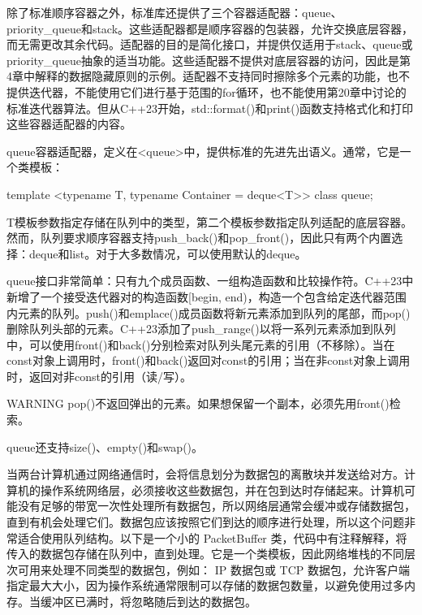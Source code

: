 
除了标准顺序容器之外，标准库还提供了三个容器适配器：queue、priority\_queue和stack。这些适配器都是顺序容器的包装器，允许交换底层容器，而无需更改其余代码。适配器的目的是简化接口，并提供仅适用于stack、queue或priority\_queue抽象的适当功能。这些适配器不提供对底层容器的访问，因此是第4章中解释的数据隐藏原则的示例。适配器不支持同时擦除多个元素的功能，也不提供迭代器，不能使用它们进行基于范围的for循环，也不能使用第20章中讨论的标准迭代器算法。但从C++23开始，std::format()和print()函数支持格式化和打印这些容器适配器的内容。


queue容器适配器，定义在<queue>中，提供标准的先进先出语义。通常，它是一个类模板：

\begin{cpp}
template <typename T, typename Container = deque<T>> class queue;
\end{cpp}

T模板参数指定存储在队列中的类型，第二个模板参数指定队列适配的底层容器。然而，队列要求顺序容器支持push\_back()和pop\_front()，因此只有两个内置选择：deque和list。对于大多数情况，可以使用默认的deque。


queue接口非常简单：只有九个成员函数、一组构造函数和比较操作符。C++23中新增了一个接受迭代器对的构造函数[begin, end)，构造一个包含给定迭代器范围内元素的队列。push()和emplace()成员函数将新元素添加到队列的尾部，而pop()删除队列头部的元素。C++23添加了push\_range()以将一系列元素添加到队列中，可以使用front()和back()分别检索对队列头尾元素的引用（不移除）。当在const对象上调用时，front()和back()返回对const的引用；当在非const对象上调用时，返回对非const的引用（读/写）。

\begin{myWarning}{WARNING}
pop()不返回弹出的元素。如果想保留一个副本，必须先用front()检索。
\end{myWarning}

queue还支持size()、empty()和swap()。


当两台计算机通过网络通信时，会将信息划分为数据包的离散块并发送给对方。计算机的操作系统网络层，必须接收这些数据包，并在包到达时存储起来。计算机可能没有足够的带宽一次性处理所有数据包，所以网络层通常会缓冲或存储数据包，直到有机会处理它们。数据包应该按照它们到达的顺序进行处理，所以这个问题非常适合使用队列结构。以下是一个小的 PacketBuffer 类，代码中有注释解释，将传入的数据包存储在队列中，直到处理。它是一个类模板，因此网络堆栈的不同层次可用来处理不同类型的数据包，例如： IP 数据包或 TCP 数据包，允许客户端指定最大大小，因为操作系统通常限制可以存储的数据包数量，以避免使用过多内存。当缓冲区已满时，将忽略随后到达的数据包。

